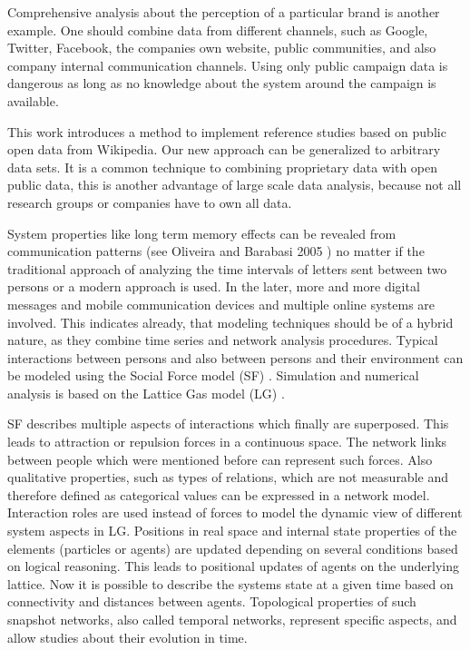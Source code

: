 \documentclass[a4paper,10pt]{scrbook}
\begin{document}
Comprehensive analysis about the perception of a particular brand is another example. One should combine data from different channels, such as Google, Twitter, Facebook, the companies own website, public communities, and also company internal communication channels. Using only public campaign data is dangerous as long as no knowledge about the system around the campaign is available. 

This work introduces a method to implement reference studies based on public open data from Wikipedia. Our new approach can be generalized to arbitrary data sets. It is a common technique to combining proprietary data with open public data, this is another advantage of large scale data analysis, because not all research groups or companies have to own all data.

System properties like long term memory effects can be revealed from communication patterns (see Oliveira and Barabasi 2005 \cite{Oliveira2005}) no matter if the traditional approach of analyzing the time intervals of letters sent between two persons or a modern approach is used. In the later, more and more digital messages and mobile communication devices and multiple online systems are involved. This indicates already, that modeling techniques should be of a hybrid nature, as they combine time series and network analysis procedures.
Typical interactions between persons and also between persons and their environment can be modeled using the Social Force model (SF) \cite{Helbing1995}. Simulation and numerical analysis is based on the Lattice Gas model (LG) \cite{Succi2001}. 


SF describes multiple aspects of interactions which finally are superposed. This leads to attraction or repulsion forces in a continuous space. The network links between people which were mentioned before can represent such forces. Also qualitative properties, such as types of relations, which are not measurable and therefore defined as categorical values can be expressed in a network model. Interaction roles are used instead of forces to model the dynamic view of different system aspects in LG. Positions in real space and internal state properties of the elements (particles or agents) are updated depending on several conditions based on logical reasoning. This leads to positional updates of agents on the underlying lattice. Now it is possible to describe the systems state at a given time based on connectivity and distances between agents. Topological properties of such snapshot networks, also called temporal networks, represent specific aspects, and allow studies about their evolution in time. 
\end{document}
